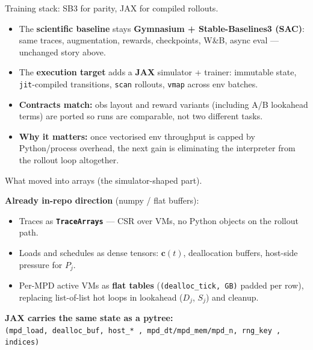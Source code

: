 \documentclass[11pt,aspectratio=43]{beamer}
\begin{document}
\begin{frame}{Training stack: SB3 for parity, JAX for compiled rollouts.}

  \vspace{0.3em}
  \begin{itemize}
    \setlength{\itemsep}{0.75em}
    \item The \textbf{scientific baseline} stays \textbf{Gymnasium + Stable-Baselines3 (SAC)}:
          same traces, augmentation, rewards, checkpoints, W\&B, async eval --- unchanged story above.
    \item The \textbf{execution target} adds a \textbf{JAX} simulator + trainer: immutable state,
          \texttt{jit}-compiled transitions, \texttt{scan} rollouts, \texttt{vmap} across env batches.
    \item \textbf{Contracts match:} obs layout and reward variants (including A/B lookahead terms)
          are ported so runs are comparable, not two different tasks.
    \item \textbf{Why it matters:} once vectorised env throughput is capped by Python/process overhead,
          the next gain is eliminating the interpreter from the rollout loop altogether.
  \end{itemize}

\end{frame}

\begin{frame}{What moved into arrays (the simulator-shaped part).}

  \vspace{0.3em}
  \textbf{Already in-repo direction} (numpy / flat buffers):
  \begin{itemize}
    \setlength{\itemsep}{0.5em}
    \item Traces as \textbf{\texttt{TraceArrays}} --- CSR over VMs, no Python objects on the rollout path.
    \item Loads and schedules as dense tensors: $\mathbf{c}(t)$, deallocation buffers, host-side pressure for $P_j$.
    \item Per-MPD active VMs as \textbf{flat tables} (\texttt{(dealloc\_tick, GB)} padded per row),
          replacing list-of-list hot loops in lookahead ($D_j$, $S_j$) and cleanup.
  \end{itemize}

  \vspace{0.6em}
  \textbf{JAX carries the same state as a pytree:}\\
  \centering
  \small\texttt{(mpd\_load,\; dealloc\_buf,\; host\_*\,,\; mpd\_dt/mpd\_mem/mpd\_n,\; rng\_key\,,\; indices)}

\end{frame}
\end{document}
